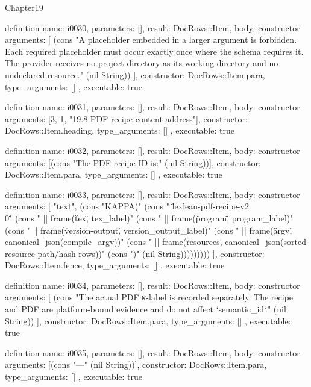\begin{lexlean}{Chapter19}
\begin{semanticmodule}
definition{
  name: i0030,
  parameters: [],
  result: DocRows::Item,
  body: constructor{
    arguments: [
      (cons "A placeholder embedded in a larger argument is forbidden. Each required placeholder must occur exactly once where the schema requires it. The provider receives no project directory as its working directory and no undeclared resource." (nil String))
    ],
    constructor: DocRows::Item.para,
    type_arguments: []
  },
  executable: true
}

definition{
  name: i0031,
  parameters: [],
  result: DocRows::Item,
  body: constructor{
    arguments: [3, 1, "19.8 PDF recipe content address"],
    constructor: DocRows::Item.heading,
    type_arguments: []
  },
  executable: true
}

definition{
  name: i0032,
  parameters: [],
  result: DocRows::Item,
  body: constructor{
    arguments: [(cons "The PDF recipe ID is:" (nil String))],
    constructor: DocRows::Item.para,
    type_arguments: []
  },
  executable: true
}

definition{
  name: i0033,
  parameters: [],
  result: DocRows::Item,
  body: constructor{
    arguments: [
      "text",
      (cons "KAPPA(" (cons "  \"lexlean-pdf-recipe-v2\\0\"" (cons "  || frame(\"tex\", tex_label)" (cons "  || frame(\"program\", program_label)" (cons "  || frame(\"version-output\", version_output_label)" (cons "  || frame(\"argv\", canonical_json(compile_argv))" (cons "  || frame(\"resources\", canonical_json(sorted resource path/hash rows))" (cons ")" (nil String)))))))))
    ],
    constructor: DocRows::Item.fence,
    type_arguments: []
  },
  executable: true
}

definition{
  name: i0034,
  parameters: [],
  result: DocRows::Item,
  body: constructor{
    arguments: [
      (cons "The actual PDF κ-label is recorded separately. The recipe and PDF are platform-bound evidence and do not affect `semantic_id`." (nil String))
    ],
    constructor: DocRows::Item.para,
    type_arguments: []
  },
  executable: true
}

definition{
  name: i0035,
  parameters: [],
  result: DocRows::Item,
  body: constructor{
    arguments: [(cons "---" (nil String))],
    constructor: DocRows::Item.para,
    type_arguments: []
  },
  executable: true
}
\end{semanticmodule}
\end{lexlean}
